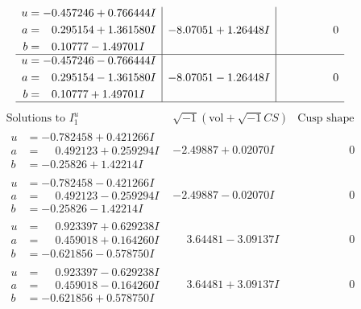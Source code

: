 \documentclass[1p]{elsarticle_modified}
\theoremstyle{definition}
\newcommand{\I}{\sqrt{-1}}
\begin{document}
$$\begin{array}{c|c|c}
\begin{aligned}
u &= -0.457246 + 0.766444 I \\
a &= \phantom{-}0.295154 + 1.361580 I \\
b &= \phantom{-}0.10777 - 1.49701 I\end{aligned}
 & -8.07051 + 1.26448 I & \phantom{-0.000000 } 0 \\ \hline\begin{aligned}
u &= -0.457246 - 0.766444 I \\
a &= \phantom{-}0.295154 - 1.361580 I \\
b &= \phantom{-}0.10777 + 1.49701 I\end{aligned}
 & -8.07051 - 1.26448 I & \phantom{-0.000000 } 0\\
 \hline 
 \end{array}$$\newpage$$\begin{array}{c|c|c}  
\text{Solutions to }I^u_{1}& \I (\text{vol} + \sqrt{-1}CS) & \text{Cusp shape}\\
 \hline 
\begin{aligned}
u &= -0.782458 + 0.421266 I \\
a &= \phantom{-}0.492123 + 0.259294 I \\
b &= -0.25826 + 1.42214 I\end{aligned}
 & -2.49887 + 0.02070 I & \phantom{-0.000000 } 0 \\ \hline\begin{aligned}
u &= -0.782458 - 0.421266 I \\
a &= \phantom{-}0.492123 - 0.259294 I \\
b &= -0.25826 - 1.42214 I\end{aligned}
 & -2.49887 - 0.02070 I & \phantom{-0.000000 } 0 \\ \hline\begin{aligned}
u &= \phantom{-}0.923397 + 0.629238 I \\
a &= \phantom{-}0.459018 + 0.164260 I \\
b &= -0.621856 - 0.578750 I\end{aligned}
 & \phantom{-}3.64481 - 3.09137 I & \phantom{-0.000000 } 0 \\ \hline\begin{aligned}
u &= \phantom{-}0.923397 - 0.629238 I \\
a &= \phantom{-}0.459018 - 0.164260 I \\
b &= -0.621856 + 0.578750 I\end{aligned}
 & \phantom{-}3.64481 + 3.09137 I & \phantom{-0.000000 } 0 \\ \hline\begin{aligned}

\end{aligned}
\end{array}$$
\end{document}

